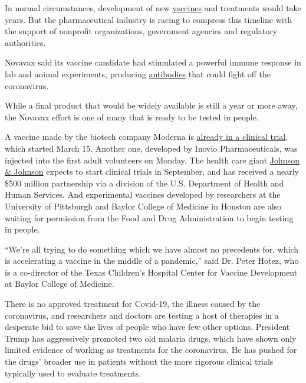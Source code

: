 In normal circumstances, development of new
\href{https://www.nytimes3xbfgragh.onion/2020/05/15/us/politics/coronavirus-vaccine-timeline.html}{vaccines}
and treatments would take years. But the pharmaceutical industry is
racing to compress this timeline with the support of nonprofit
organizations, government agencies and regulatory authorities.

Novavax said its vaccine candidate had stimulated a powerful immune
response in lab and animal experiments, producing
\href{https://www.nytimes3xbfgragh.onion/2020/04/10/health/coronavirus-antibody-test.html}{antibodies}
that could fight off the coronavirus.

While a final product that would be widely available is still a year or
more away, the Novavax effort is one of many that is ready to be tested
in people.

A vaccine made by the biotech company Moderna is
\href{https://www.nytimes3xbfgragh.onion/2020/05/18/health/coronavirus-vaccine-moderna.html}{already
in a clinical trial}, which started March 15. Another one, developed by
Inovio Pharmaceuticals, was injected into the first adult volunteers on
Monday. The health care giant
\href{https://www.nytimes3xbfgragh.onion/2020/05/19/business/johnson-baby-powder-sales-stopped.html}{Johnson
\& Johnson} expects to start clinical trials in September, and has
received a nearly \$500 million partnership via a division of the U.S.
Department of Health and Human Services. And experimental vaccines
developed by researchers at the University of Pittsburgh and Baylor
College of Medicine in Houston are also waiting for permission from the
Food and Drug Administration to begin testing in people.

``We're all trying to do something which we have almost no precedents
for, which is accelerating a vaccine in the middle of a pandemic,'' said
Dr. Peter Hotez, who is a co-director of the Texas Children's Hospital
Center for Vaccine Development at Baylor College of Medicine.

There is no approved treatment for Covid-19, the illness caused by the
coronavirus, and researchers and doctors are testing a host of therapies
in a desperate bid to save the lives of people who have few other
options. President Trump has aggressively promoted two old malaria
drugs, which have shown only limited evidence of working as treatments
for the coronavirus. He has pushed for the drugs' broader use in
patients without the more rigorous clinical trials typically used to
evaluate treatments.

